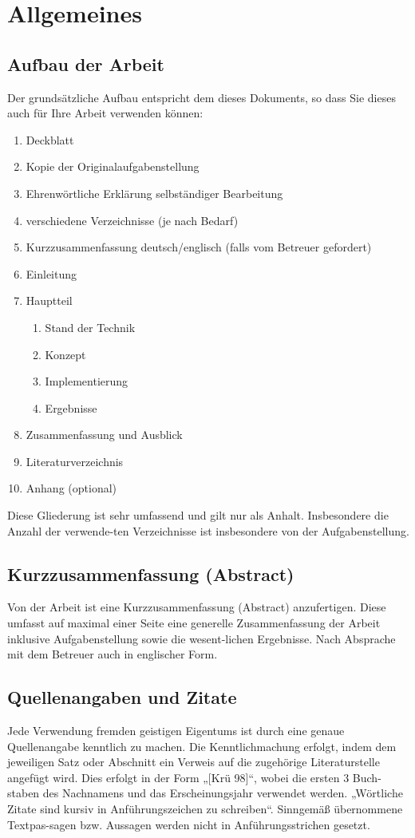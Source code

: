 \chapter{Allgemeines}
\label{chap:allgemeines}

\section{Aufbau der Arbeit}
Der grundsätzliche Aufbau entspricht dem dieses Dokuments, so dass Sie dieses auch für Ihre Arbeit verwenden können:
\begin{enumerate}
	\item Deckblatt
	\item Kopie der Originalaufgabenstellung
	\item Ehrenwörtliche Erklärung selbständiger Bearbeitung
	\item verschiedene Verzeichnisse (je nach Bedarf)
	\item Kurzzusammenfassung deutsch/englisch (falls vom Betreuer gefordert)
	\item Einleitung
	\item Hauptteil
	\begin{enumerate}
		\item Stand der Technik
		\item Konzept
		\item Implementierung
		\item Ergebnisse 
	\end{enumerate}
	\item Zusammenfassung und Ausblick
	\item Literaturverzeichnis
	\item Anhang (optional)
\end{enumerate}

Diese Gliederung ist sehr umfassend und gilt nur als Anhalt. Insbesondere die Anzahl der verwende-ten Verzeichnisse ist insbesondere von der Aufgabenstellung.

\section{Kurzzusammenfassung (Abstract)}
Von der Arbeit ist eine Kurzzusammenfassung (Abstract) anzufertigen. Diese umfasst auf maximal einer Seite eine generelle Zusammenfassung der Arbeit inklusive Aufgabenstellung sowie die wesent-lichen Ergebnisse. Nach Absprache mit dem Betreuer auch in englischer Form.

\section{Quellenangaben und Zitate}
Jede Verwendung fremden geistigen Eigentums ist durch eine genaue Quellenangabe kenntlich zu machen. Die Kenntlichmachung erfolgt, indem dem jeweiligen Satz oder Abschnitt ein Verweis auf die zugehörige Literaturstelle angefügt wird. Dies erfolgt in der Form „[Krü 98]“, wobei die ersten 3 Buch-staben des Nachnamens und das Erscheinungsjahr verwendet werden.
„Wörtliche Zitate sind kursiv in Anführungszeichen zu schreiben“. Sinngemäß übernommene Textpas-sagen bzw. Aussagen werden nicht in Anführungsstrichen gesetzt.

